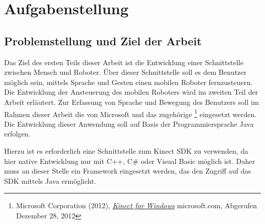 \chapter{Aufgabenstellung}
\label{chap:Aufgabenstellung}

\section{Problemstellung und Ziel der Arbeit}


%

%
Das Ziel des ersten Teils dieser Arbeit ist die Entwicklung einer Schnittstelle zwischen Mensch und Roboter.
\"Uber dieser Schnittstelle soll es dem Benutzer m\"oglich sein, mittels Sprache und Gesten einen mobilen Roboter fernzusteuern. 
Die Entwicklung der Ansteuerung des mobilen Roboters wird im zweiten Teil der Arbeit erl\"autert.
\newline
Zur Erfassung von Sprache und Bewegung des Benutzers soll im Rahmen dieser Arbeit die \textit{} von Microsoft 
und das zugeh\"orige \textit{} \footnote{Microsoft Corporation (2012), \href{http://www.microsoft.com/en-us/kinectforwindows/}{\textit{Kinect for Windows}} microsoft.com, Abgerufen Dezember 28, 2012} eingesetzt werden. 
Die Entwicklung dieser Anwendung soll auf Basis der Programmiersprache Java erfolgen.

Hierzu ist es erforderlich eine Schnittstelle zum Kinect \acrshort{SDK} zu verwenden, da hier native Entwicklung nur mit C++, C\# oder Visual Basic m\"oglich ist.
Daher muss an dieser Stelle ein Framework eingesetzt werden, das den Zugriff auf das \acrshort{SDK} mittels Java erm\"oglicht.

